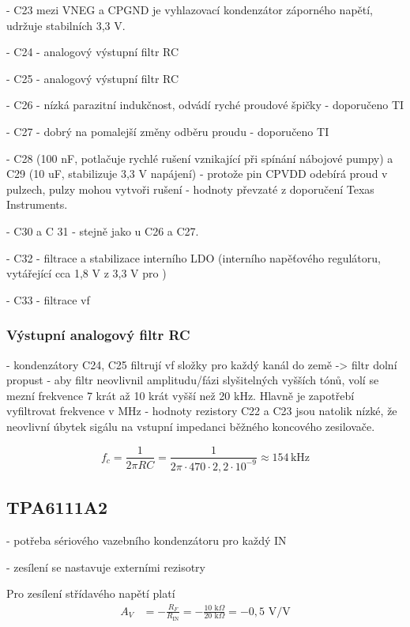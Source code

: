 \documentclass[12pt, a4paper]{article}
\begin{document}
- C23 mezi VNEG a CPGND je vyhlazovací kondenzátor záporného napětí, udržuje stabilních 3,3 V. 

- C24 - analogový výstupní filtr RC

- C25 - analogový výstupní filtr RC

- C26 - nízká parazitní indukčnost, odvádí ryché proudové špičky - doporučeno TI

- C27 - dobrý na pomalejší změny odběru proudu - doporučeno TI

- C28 (100 nF, potlačuje rychlé rušení vznikající při spínání nábojové pumpy) a C29 (10 uF, stabilizuje 3,3 V napájení) - protože pin CPVDD odebírá proud v pulzech, pulzy mohou vytvoři rušení - hodnoty převzaté z doporučení Texas Instruments.

- C30 a C 31 - stejně jako u C26 a C27.

- C32 - filtrace a stabilizace interního LDO (interního napěťového regulátoru, vytářející cca 1,8 V z 3,3 V pro )

- C33 - filtrace vf 

\subsubsection{Výstupní analogový filtr RC}

- kondenzátory C24, C25 filtrují vf složky pro každý kanál do země -> filtr dolní propust
- aby filtr neovlivnil amplitudu/fázi slyšitelných vyšších tónů, volí se mezní frekvence 7 krát až 10 krát vyšší než 20 kHz. Hlavně je zapotřebí vyfiltrovat frekvence v MHz
- hodnoty rezistory C22 a C23 jsou natolik nízké, že neovlivní úbytek sigálu na vstupní impedanci běžného koncového zesilovače.

\[ f_c = \frac{1}{2\pi R C} = \frac{1}{2\pi \cdot 470 \cdot 2{,}2 \cdot 10^{-9}} \approx 154\,\text{kHz} \]


\subsection{TPA6111A2}
- potřeba sériového vazebního kondenzátoru pro každý IN

- zesílení se nastavuje externími rezisotry

Pro zesílení střídavého napětí platí
\begin{align*}
A_V &= -\frac{R_F}{R_{\text{IN}}} = -\frac{10\text{ k}\Omega}{20\text{ k}\Omega} = -0{,}5\text{ V/V}
\end{align*}
\end{document}
